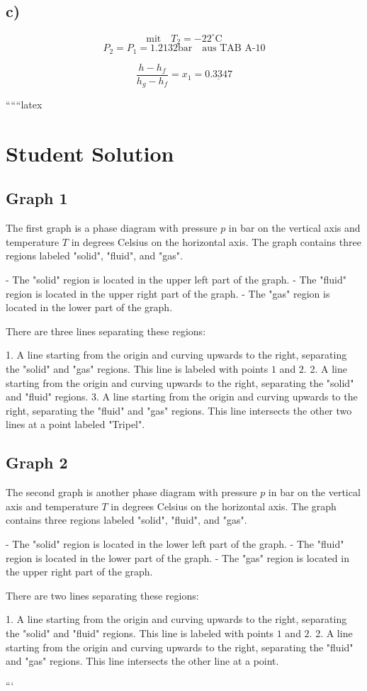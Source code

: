 

\subsection*{c)}
\[
\text{mit} \quad T_2 = -22^\circ \text{C}
\]
\[
P_2 = P_1 = 1.2132 \text{bar} \quad \text{aus TAB A-10}
\]

\[
\frac{h - h_f}{h_g - h_f} = x_1 = \underline{0.3347}
\]

``````latex


\section*{Student Solution}

\subsection*{Graph 1}

The first graph is a phase diagram with pressure \( p \) in bar on the vertical axis and temperature \( T \) in degrees Celsius on the horizontal axis. The graph contains three regions labeled "solid", "fluid", and "gas". 

- The "solid" region is located in the upper left part of the graph.
- The "fluid" region is located in the upper right part of the graph.
- The "gas" region is located in the lower part of the graph.

There are three lines separating these regions:

1. A line starting from the origin and curving upwards to the right, separating the "solid" and "gas" regions. This line is labeled with points \( 1 \) and \( 2 \).
2. A line starting from the origin and curving upwards to the right, separating the "solid" and "fluid" regions.
3. A line starting from the origin and curving upwards to the right, separating the "fluid" and "gas" regions. This line intersects the other two lines at a point labeled "Tripel".

\subsection*{Graph 2}

The second graph is another phase diagram with pressure \( p \) in bar on the vertical axis and temperature \( T \) in degrees Celsius on the horizontal axis. The graph contains three regions labeled "solid", "fluid", and "gas". 

- The "solid" region is located in the lower left part of the graph.
- The "fluid" region is located in the lower part of the graph.
- The "gas" region is located in the upper right part of the graph.

There are two lines separating these regions:

1. A line starting from the origin and curving upwards to the right, separating the "solid" and "fluid" regions. This line is labeled with points \( 1 \) and \( 2 \).
2. A line starting from the origin and curving upwards to the right, separating the "fluid" and "gas" regions. This line intersects the other line at a point.

```